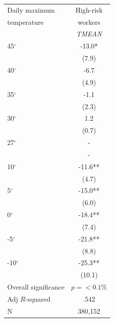 \begin{table}[htbp]
\centering
\begin{tabular}{lc}
\hline
Daily maximum & High-risk \\
temperature & workers \\
 & \textit{TMEAN} \\
\hline
45$^\circ$ & -13.0* \\
 & (7.9) \\
40$^\circ$ & -6.7 \\
 & (4.9) \\
35$^\circ$ & -1.1 \\
 & (2.3) \\
30$^\circ$ & 1.2 \\
 & (0.7) \\
27$^\circ$ & - \\
 & - \\
10$^\circ$ & -11.6** \\
 & (4.7) \\
5$^\circ$ & -15.0** \\
 & (6.0) \\
0$^\circ$ & -18.4** \\
 & (7.4) \\
-5$^\circ$ & -21.8** \\
 & (8.8) \\
-10$^\circ$ & -25.3** \\
 & (10.1) \\
\hline
Overall significance & \(p = <0.1\%\) \\
Adj \(R\)-squared & .542 \\
N & 380,152 \\
\hline
\end{tabular}
\end{table}

